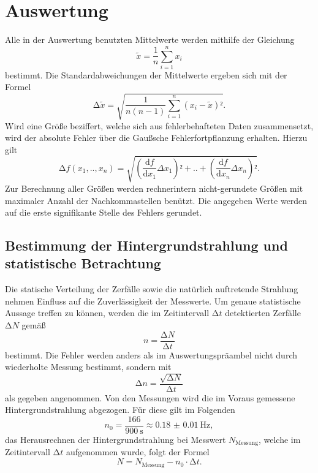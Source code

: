 \newpage
\section{Auswertung}
\label{sec:Auswertung}
Alle in der Auswertung benutzten Mittelwerte werden mithilfe der Gleichung
\begin{equation}
\tilde{x}=\frac{1}{n}\sum_{i=1}^n {x_i}
\end{equation}
bestimmt. Die Standardabweichungen der Mittelwerte ergeben sich mit der Formel
\begin{equation}
\mathup\Delta{\tilde{x}}=\sqrt{\frac{1}{n(n-1)}\sum_{i=1}^n {(x_i-\tilde{x})²}}.
\end{equation}
Wird eine Größe beziffert, welche sich aus fehlerbehafteten Daten zusammensetzt, wird der absolute Fehler über die Gaußsche Fehlerfortpflanzung erhalten.
Hierzu gilt
\begin{equation}
\mathup\Delta{f}(x_1,..,x_n)=\sqrt{\left(\frac{\mathup{d}f}{\mathup{d}x_1}\Delta{x_1}\right)²+..+\left(\frac{\mathup{d}f}{\mathup{d}x_n}\Delta{x_n}\right)²}.
\end{equation}
Zur Berechnung aller Größen werden rechnerintern nicht-gerundete Größen mit maximaler Anzahl der Nachkommastellen benützt.
Die angegeben Werte werden auf die erste signifikante Stelle des Fehlers gerundet.

\subsection{Bestimmung der Hintergrundstrahlung und statistische Betrachtung}
\label{sec:Auswertung_hintergrund}
Die statische Verteilung der Zerfälle sowie die natürlich auftretende Strahlung nehmen Einfluss auf die Zuverlässigkeit der Messwerte.
Um genaue statistische Aussage treffen zu können, werden die im Zeitintervall $\mathup\Delta t$ detektierten Zerfälle $\mathup\Delta N$ gemäß
\begin{equation}
	n=\frac{\mathup\Delta N}{\mathup\Delta t}
\end{equation}
bestimmt.
Die Fehler werden anders als im Auswertungspräambel nicht durch wiederholte Messung bestimmt, sondern mit
\begin{equation}
	\mathup\Delta n=\frac{\sqrt{\mathup\Delta N}}{\mathup\Delta t}
\end{equation}
als gegeben angenommen.
Von den Messungen wird die im Voraus gemessene Hintergrundstrahlung abgezogen. 
Für diese gilt im Folgenden
\begin{equation}
	n_0=\frac{166}{\SI{900}{\second}}\approx\SI{0.18(1)}{\hertz},
\end{equation}
das Herausrechnen der Hintergrundstrahlung bei Messwert $N_\text{Messung}$, welche im Zeitintervall $\mathup\Delta t$ aufgenommen wurde, folgt der Formel
\begin{equation}
	N=N_{\text{Messung}}-n_0\cdot\mathup\Delta t.
\end{equation}


